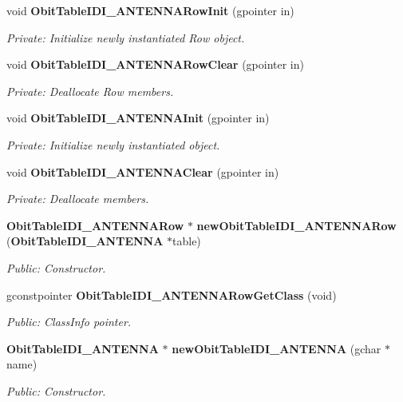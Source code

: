 \begin{CompactItemize}
\item 
void {\bf Obit\-Table\-IDI\_\-ANTENNARow\-Init} (gpointer in)
\begin{CompactList}\small\item\em Private: Initialize newly instantiated Row object. \item\end{CompactList}\item 
void {\bf Obit\-Table\-IDI\_\-ANTENNARow\-Clear} (gpointer in)
\begin{CompactList}\small\item\em Private: Deallocate Row members. \item\end{CompactList}\item 
void {\bf Obit\-Table\-IDI\_\-ANTENNAInit} (gpointer in)
\begin{CompactList}\small\item\em Private: Initialize newly instantiated object. \item\end{CompactList}\item 
void {\bf Obit\-Table\-IDI\_\-ANTENNAClear} (gpointer in)
\begin{CompactList}\small\item\em Private: Deallocate members. \item\end{CompactList}\item 
{\bf Obit\-Table\-IDI\_\-ANTENNARow} $\ast$ {\bf new\-Obit\-Table\-IDI\_\-ANTENNARow} ({\bf Obit\-Table\-IDI\_\-ANTENNA} $\ast$table)
\begin{CompactList}\small\item\em Public: Constructor. \item\end{CompactList}\item 
gconstpointer {\bf Obit\-Table\-IDI\_\-ANTENNARow\-Get\-Class} (void)
\begin{CompactList}\small\item\em Public: Class\-Info pointer. \item\end{CompactList}\item 
{\bf Obit\-Table\-IDI\_\-ANTENNA} $\ast$ {\bf new\-Obit\-Table\-IDI\_\-ANTENNA} (gchar $\ast$name)
\begin{CompactList}\small\item\em Public: Constructor. \item\end{CompactList}\item 

\end{CompactItemize}
